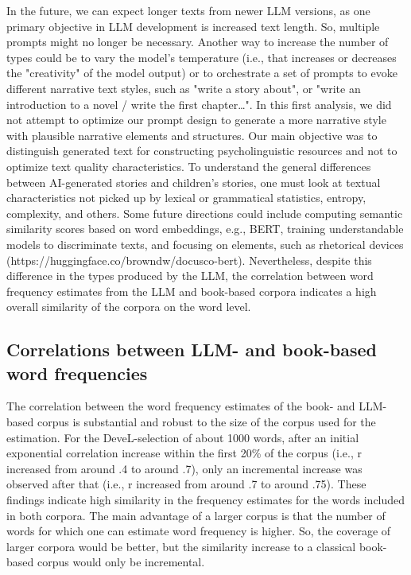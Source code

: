 \documentclass[jou, a4paper]{apa7}
\begin{document}
In the future, we can expect longer texts from newer LLM versions, as one primary objective in LLM development is increased text length. So, multiple prompts might no longer be necessary. Another way to increase the number of types could be to vary the model's temperature (i.e., that increases or decreases the "creativity" of the model output) or to orchestrate a set of prompts to evoke different narrative text styles, such as "write a story about", or "write an introduction to a novel / write the first chapter…". In this first analysis, we did not attempt to optimize our prompt design to generate a more narrative style with plausible narrative elements and structures. Our main objective was to distinguish generated text for constructing psycholinguistic resources and not to optimize text quality characteristics. To understand the general differences between AI-generated stories and children's stories, one must look at textual characteristics not picked up by lexical or grammatical statistics, entropy, complexity, and others. Some future directions could include computing semantic similarity scores based on word embeddings, e.g., BERT, training understandable models to discriminate texts, and focusing on elements, such as rhetorical devices (https://huggingface.co/browndw/docusco-bert). Nevertheless, despite this difference in the types produced by the LLM, the correlation between word frequency estimates from the LLM and book-based corpora indicates a high overall similarity of the corpora on the word level.

\subsection*{Correlations between LLM- and book-based word frequencies}

The correlation between the word frequency estimates of the book- and LLM-based corpus is substantial and robust to the size of the corpus used for the estimation. For the DeveL-selection of about 1000 words, after an initial exponential correlation increase within the first 20\% of the corpus (i.e., r increased from around .4 to around .7), only an incremental increase was observed after that (i.e., r increased from around .7 to around .75). These findings indicate high similarity in the frequency estimates for the words included in both corpora. The main advantage of a larger corpus is that the number of words for which one can estimate word frequency is higher. So, the coverage of larger corpora would be better, but the similarity increase to a classical book-based corpus would only be incremental. 
\end{document}
